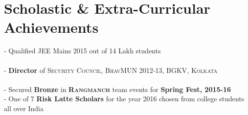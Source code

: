 \documentclass[a4paper,11pt]{extarticle} %
\begin{document}
\section{Scholastic \& Extra-Curricular Achievements}

{\hspace{0.5cm}- Qualified JEE Mains 2015 out of 14 Lakh students}\\ \hspace*{0.5cm}{- Qualified JEE Advanced 2015 out of 5 Lakh students}\\
{\hspace*{0.5cm}- \textbf{Director} of \textsc{Security Council, BhavMUN 2012-13, BGKV, Kolkata}}\\
\\
{\hspace*{0.5cm}- Secured \textbf{Bronze} in \textsc{\textbf{Rangmanch}} team events for \textbf{Spring Fest, 2015-16}}\\
{\hspace*{0.5cm}- One of 7 \textbf{Risk Latte Scholars} for the year 2016 chosen from college students all over India}


\end{document}

